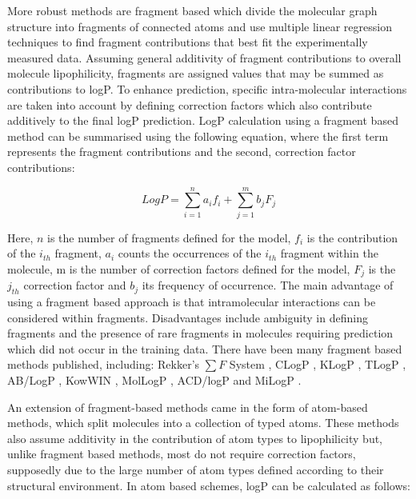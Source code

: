 \documentclass[10pt]{bmc_article}
\newenvironment{bmcformat}{\begin{raggedright}\baselineskip20pt\sloppy\setboolean{publ}{false}}{\end{raggedright}\baselineskip20pt\sloppy}
\begin{document}
\begin{bmcformat}
More robust methods are fragment based \cite{rekker_calculation_1992, leo_partition_1971, hansch_substituent_1979, leo_calculating_1993, klopman_computer_1994, junghans_estimation_1997, japertas_fragmental_2002, meylan_estimating_2000, _molsoft_2013, petrauskas_acd/log_2000, _molinspiratoin_2013} which divide the molecular graph structure into fragments of connected atoms and use multiple linear regression techniques to find fragment contributions that best fit the experimentally measured data. Assuming general additivity of fragment contributions to overall molecule lipophilicity, fragments are assigned values that may be summed as contributions to logP. To enhance prediction, specific intra-molecular interactions are taken into account by defining correction factors which also contribute additively to the final logP prediction. LogP calculation using a fragment based method can be summarised using the following equation, where the first term represents the fragment contributions and the second, correction factor contributions:

\begin{equation}
  \label{eq:logP_fragment}
  LogP = \sum_{i=1}^n a_i f_i + \sum_{j=1}^m b_j F_j
\end{equation}

Here, $n$ is the number of fragments defined for the model, $f_i$ is the contribution of the $i_{th}$ fragment, $a_i$ counts the occurrences of the $i_{th}$ fragment within the molecule, m is the number of correction factors defined for the model, $F_j$ is the $j_{th}$ correction factor and $b_j$ its frequency of occurrence. The main advantage of using a fragment based approach is that intramolecular interactions can be considered within fragments. Disadvantages include ambiguity in defining fragments and the presence of rare fragments in molecules requiring prediction which did not occur in the training data. There have been many fragment based methods published, including: Rekker's $\sum F$ System \cite{rekker_calculation_1992}, CLogP \cite{leo_partition_1971, hansch_substituent_1979, leo_calculating_1993}, KLogP \cite{klopman_computer_1994}, TLogP \cite{junghans_estimation_1997}, AB/LogP \cite{japertas_fragmental_2002}, KowWIN \cite{meylan_estimating_2000}, MolLogP \cite{_molsoft_2013}, ACD/logP \cite{petrauskas_acd/log_2000} and MiLogP \cite{_molinspiratoin_2013}.

An extension of fragment-based methods came in the form of atom-based methods, which split molecules into a collection of typed atoms. These methods also assume additivity in the contribution of atom types to lipophilicity but, unlike fragment based methods, most do not require correction factors, supposedly due to the large number of atom types defined according to their structural environment\cite{mannhold_calculation_2009}. In atom based schemes, logP can be calculated as follows:


\end{bmcformat}
\end{document}

